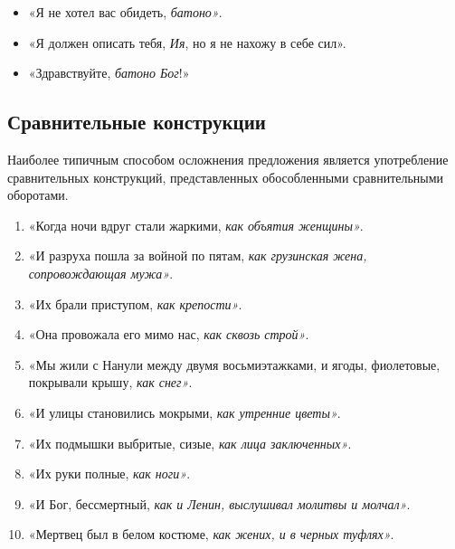 \documentclass{kursa4}
\begin{document}
{\begin{enumerate}
          \begin{itemize}
            \item «Я не хотел вас обидеть, \textit{батоно»}.
            \item «Я должен описать тебя, \textit{Ия}, но я не нахожу в себе сил».
            \item «Здравствуйте, \textit{батоно Бог}!»
          \end{itemize}
        \end{enumerate}

      \subsection{Сравнительные конструкции}
      Наиболее типичным способом осложнения предложения является употребление сравнительных конструкций, представленных обособленными сравнительными оборотами.
      \begin{enumerate}
        \item «Когда ночи вдруг стали жаркими, \textit{как объятия женщины»}.
        \item «И разруха пошла за войной по пятам, \textit{как грузинская жена, сопровождающая мужа»}.
        \item «Их брали приступом, \textit{как крепости»}.
        \item «Она провожала его мимо нас, \textit{как сквозь строй»}.
        \item «Мы жили с Нанули между двумя восьмиэтажками, и ягоды, фиолетовые, покрывали крышу, \textit{как снег»}.
        \item «И улицы становились мокрыми, \textit{как утренние цветы»}.
        \item «Их подмышки выбритые, сизые, \textit{как лица заключенных»}.
        \item «Их руки полные, \textit{как ноги»}.
        \item «И Бог, бессмертный, \textit{как и Ленин, выслушивал молитвы и молчал»}.
        \item «Мертвец был в белом костюме, \textit{как жених, и в черных туфлях»}.
      \end{enumerate}

}
\end{document}

